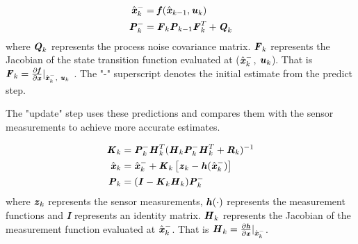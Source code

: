 \begin{equation*}
\begin{split}
\hat{\textbf{\textit{x}}}_{k}^{-}&=\textbf{\textit{f}}(\hat{\textbf{\textit{x}}}_{k-1}, \textbf{\textit{u}}_{k})\\
\textbf{\textit{P}}_{k}^{-}&=\textbf{\textit{F}}_{k}\textbf{\textit{P}}_{k-1}\textbf{\textit{F}}_{k}^{T}+\textbf{\textit{Q}}_{k}
\end{split}
\end{equation*}
where $\textbf{\textit{Q}}_{k}$ represents the process noise covariance matrix. $\textbf{\textit{F}}_{k}$ represents the Jacobian of the state transition function evaluated at ($\hat{\textbf{\textit{x}}}_{k}^{-}$, $\textbf{\textit{u}}_{k}$). That is $\textbf{\textit{F}}_{k}=\frac{\partial \textbf{\textit{f}}}{\partial \textbf{\textit{x}}}|_{\hat{\textbf{\textit{x}}}_{k}^{-}, \textbf{\textit{ u}}_{k}}$ . The "-" superscript denotes the initial estimate from the predict step.


The "update" step uses these predictions and compares them with the sensor measurements to achieve more accurate estimates.

\begin{equation*}
\begin{split}
\textbf{\textit{K}}_{k}&=\textbf{\textit{P}}_{k}^{-}\textbf{\textit{H}}_{k}^{T}(\textbf{\textit{H}}_{k}\textbf{\textit{P}}_{k}^{-}\textbf{\textit{H}}_{k}^{T}+\textbf{\textit{R}}_{k})^{-1}\\
\hat{\textbf{\textit{x}}}_{k}&=\hat{\textbf{\textit{x}}}_{k}^{-}+\textbf{\textit{K}}_{k}\left[\textbf{\textit{z}}_{k}-\textbf{\textit{h}}(\hat{\textbf{\textit{x}}}_{k}^{-})\right]\\
\textbf{\textit{P}}_{k}&=(\textbf{\textit{I}}-\textbf{\textit{K}}_{k}\textbf{\textit{H}}_{k})\textbf{\textit{P}}_{k}^{-}
\end{split}
\end{equation*}
where $\textbf{\textit{z}}_{k}$ represents the sensor measurements, $\textbf{\textit{h}}(\cdot)$ represents the measurement functions and \textbf{\textit{I}} represents an identity matrix. $\textbf{\textit{H}}_{k}$ represents the Jacobian of the measurement function evaluated at $\hat{\textbf{\textit{x}}}_{k}^{-}$. That is $\textbf{\textit{H}}_{k}=\frac{\partial \textbf{\textit{h}}}{\partial \textbf{\textit{x}}}|_{\hat{\textbf{\textit{x}}}_{k}^{-}}$.

